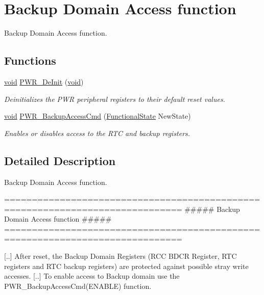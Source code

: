 \hypertarget{group___p_w_r___group1}{\section{Backup Domain Access function}
\label{group___p_w_r___group1}
}


Backup Domain Access function.  


\subsection*{Functions}
\begin{DoxyCompactItemize}
\item 
\hyperlink{group___n_a_m_e_ga18028b8badbf1ea7e704ccac3c488e82}{void} \hyperlink{group___p_w_r___group1_gad03a0aac7bc3bc3a9fd012f3769a6990}{P\-W\-R\-\_\-\-De\-Init} (\hyperlink{group___n_a_m_e_ga18028b8badbf1ea7e704ccac3c488e82}{void})
\begin{DoxyCompactList}\small\item\em Deinitializes the P\-W\-R peripheral registers to their default reset values. \end{DoxyCompactList}\item 
\hyperlink{group___n_a_m_e_ga18028b8badbf1ea7e704ccac3c488e82}{void} \hyperlink{group___p_w_r___group1_ga0741aea35572b1a75f82b74de12df800}{P\-W\-R\-\_\-\-Backup\-Access\-Cmd} (\hyperlink{group___exported__types_gac9a7e9a35d2513ec15c3b537aaa4fba1}{Functional\-State} New\-State)
\begin{DoxyCompactList}\small\item\em Enables or disables access to the R\-T\-C and backup registers. \end{DoxyCompactList}\end{DoxyCompactItemize}


\subsection{Detailed Description}
Backup Domain Access function. \begin{DoxyVerb}  ==============================================================================
                   ##### Backup Domain Access function #####
  ==============================================================================

    [..] After reset, the Backup Domain Registers (RCC BDCR Register, RTC registers
         and RTC backup registers) are protected against possible stray write accesses.
    [..] To enable access to Backup domain use the PWR_BackupAccessCmd(ENABLE) function.\end{DoxyVerb}


